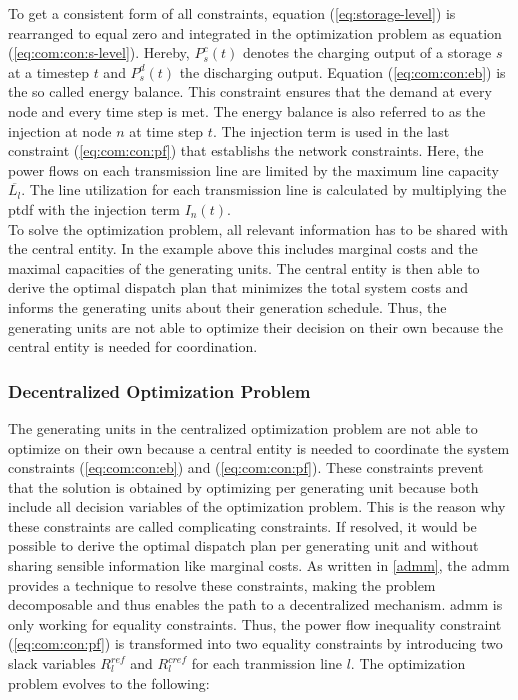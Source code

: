 To get a consistent form of all constraints, equation (\ref{eq:storage-level}) is rearranged to equal zero and integrated in the optimization problem as equation (\ref{eq:com:con:s-level}). Hereby, $P_s^c(t)$ denotes the charging output of a storage $s$ at a timestep $t$ and $P_s^d(t)$ the discharging output. Equation (\ref{eq:com:con:eb}) is the so called energy balance. This constraint ensures that the demand at every node and every time step is met. The energy balance is also referred to as the injection at node $n$ at time step $t$. The injection term is used in the last constraint (\ref{eq:com:con:pf}) that establishs the network constraints. Here, the power flows on each transmission line are limited by the maximum line capacity $\overline{L_l}$. The line utilization for each transmission line is calculated by multiplying the \gls{ptdf} with the injection term $I_n(t)$.\\

	
To solve the optimization problem, all relevant information has to be shared with the central entity. In the example above this includes marginal costs and the maximal capacities of the generating units. The central entity is then able to derive the optimal dispatch plan that minimizes the total system costs and informs the generating units about their generation schedule. Thus, the generating units are not able to optimize their decision on their own because the central entity is needed for coordination.	

\subsubsection{Decentralized Optimization Problem}
\label{sec:app:dom}

The generating units in the centralized optimization problem are not able to optimize on their own because a central entity is needed to coordinate the system constraints (\ref{eq:com:con:eb}) and (\ref{eq:com:con:pf}). These constraints prevent that the solution is obtained by optimizing per generating unit because both include all decision variables of the optimization problem. This is the reason why these constraints are called complicating constraints. If resolved, it would be possible to derive the optimal dispatch plan per generating unit and without sharing sensible information like marginal costs. As written in \ref{admm}, the \gls{admm} provides a technique to resolve these constraints, making the problem decomposable and thus enables the path to a decentralized mechanism. \gls{admm} is only working for equality constraints. Thus, the power flow inequality constraint (\ref{eq:com:con:pf}) is transformed into two equality constraints by introducing two slack variables $R^{ref}_l$ and $R^{cref}_l$ for each tranmission line $l$. The optimization problem evolves to the following:

